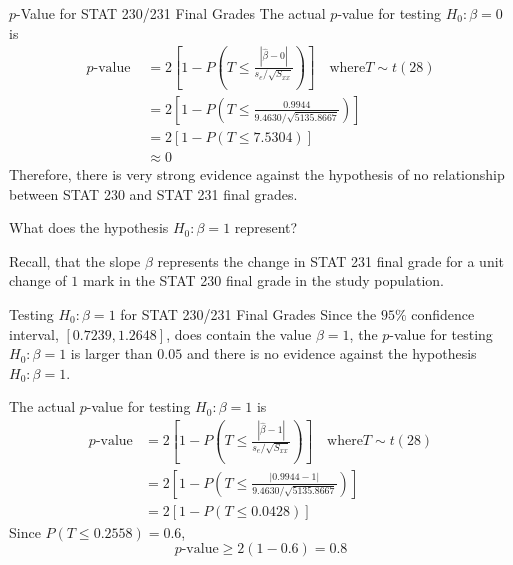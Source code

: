 \documentclass[oneside]{book}
\begin{document}
\begin{Example}{$ p $-Value for STAT 230/231 Final Grades}{}
    The actual $ p $-value for testing $ H_0:\beta=0 $ is
    \[\begin{aligned}
            p\text{-value }
             & =2\left[1-P\left(T \leq \frac{|\hat{\beta}-0|}{s_{e} / \sqrt{S_{x x}}}\right)\right]
            \quad \text{where}T \sim t(28)                                                          \\
             & =2\left[1-P\left(T \leq \frac{0.9944}{9.4630 / \sqrt{5135.8667}}\right)\right]       \\
             & =2[1-P(T \leq 7.5304)]                                                               \\
             & \approx 0
        \end{aligned}\]
    Therefore, there is very strong evidence against the hypothesis of no relationship
    between STAT 230 and STAT 231 final grades.
\end{Example}


What does the hypothesis $ H_0:\beta=1 $ represent?

Recall, that the slope $ \beta $ represents the change in STAT 231 final grade
for a unit change of $ 1 $ mark in the STAT 230 final grade in the study population.

\begin{Example}{Testing $ H_0:\beta=1 $ for STAT 230/231 Final Grades}{}
    Since the $ 95\% $ confidence interval, $ \left[ 0.7239,1.2648 \right] $,
    does contain the value $ \beta=1 $, the $ p $-value for testing
    $ H_0:\beta=1 $ is larger than $ 0.05 $ and there is no evidence against the hypothesis
    $ H_0:\beta=1 $.

    The actual $ p $-value for testing $ H_0:\beta=1 $ is
    \[
        \begin{aligned}
            p\text{-value}
             & =2\left[1-P\left(T \leq \frac{|\hat{\beta}-1|}{s_{e} / \sqrt{S_{x x}}}\right)\right]
            \quad \text{where} T \sim t(28)                                                         \\
             & =2\left[1-P\left(T \leq \frac{|0.9944-1|}{9.4630 / \sqrt{5135.8667}}\right)\right]   \\
             & =2[1-P(T \leq 0.0428)]
        \end{aligned}
    \]
    Since $ P(T\leq 0.2558)=0.6 $,
    \[ p\text{-value}\geq 2(1-0.6)=0.8 \]
\end{Example}
\end{document}

